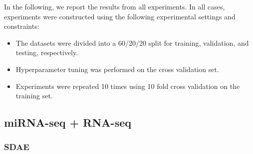 In the following, we report the results from all experiments. In all cases, experiments were constructed using the following experimental settings and constraints:

\begin{itemize}
    \item The datasets were divided into a 60/20/20 split for training, validation, and testing, respectively.
    \item Hyperparameter tuning was performed on the cross validation set.
    \item Experiments were repeated 10 times using 10 fold cross validation on the training set.
\end{itemize}

\subsection{miRNA-seq + RNA-seq}\label{subsub:m_r_SDAE}

\subsubsection{SDAE}

